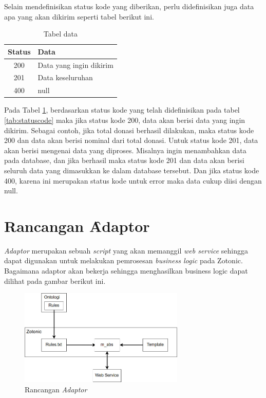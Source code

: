 	Selain mendefinisikan status kode yang diberikan, perlu didefinisikan juga data apa yang akan dikirim seperti tabel berikut ini.
	
	\begin{table}
		\centering
		\caption{Tabel data}
		\label{tab:tabelData}
		\begin{tabular}{| c | l |}
			\hline
			Status & Data \\ 
			\hline
			200 & Data yang ingin dikirim \\
			201 & Data keseluruhan \\
			400 & null\\
			\hline
		\end{tabular}
	\end{table}

	Pada Tabel \ref{tab:tabelData}, berdasarkan status kode yang telah didefinisikan pada tabel \ref{tab:statuscode} maka jika status kode 200, data akan berisi data yang ingin dikirim. Sebagai contoh, jika total donasi berhasil dilakukan, maka status kode 200 dan data akan berisi nominal dari total donasi. Untuk status kode 201, data akan berisi mengenai data yang diproses. Misalnya ingin menambahkan data pada database, dan jika berhasil maka status kode 201 dan data akan berisi seluruh data yang dimasukkan ke dalam database tersebut. Dan jika status kode 400, karena ini merupakan status kode untuk error maka data cukup diisi dengan null.
\section{Rancangan \f{Adaptor}}

\textit{Adaptor} merupakan sebuah \textit{script} yang akan memanggil \textit{web service} sehingga dapat digunakan untuk melakukan pemrosesan \textit{business logic} pada Zotonic. Bagaimana adaptor akan bekerja sehingga menghasilkan business logic dapat dilihat pada gambar berikut ini.

\begin{figure}
	\centering
	\includegraphics[width=0.7\textwidth]
		{pics/adaptor.jpg}
	\caption{Rancangan \textit{Adaptor}}
	\label{fig:adaptor}
\end{figure}
\vspace{-0.3cm}

